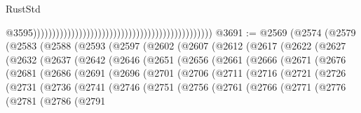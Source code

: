 \begin{lexlean}{RustStd}
\begin{coremodule}
                                                                                                  @3595)))))))))))))))))))))))))))))))))))))))))))))))
@3691 := @2569
    (@2574
      (@2579
        (@2583
          (@2588
            (@2593
              (@2597
                (@2602
                  (@2607
                    (@2612
                      (@2617
                        (@2622
                          (@2627
                            (@2632
                              (@2637
                                (@2642
                                  (@2646
                                    (@2651
                                      (@2656
                                        (@2661
                                          (@2666
                                            (@2671
                                              (@2676
                                                (@2681
                                                  (@2686
                                                    (@2691
                                                      (@2696
                                                        (@2701
                                                          (@2706
                                                            (@2711
                                                              (@2716
                                                                (@2721
                                                                  (@2726
                                                                    (@2731
                                                                      (@2736
                                                                        (@2741
                                                                          (@2746
                                                                            (@2751
                                                                              (@2756
                                                                                (@2761
                                                                                  (@2766
                                                                                    (@2771
                                                                                      (@2776
                                                                                        (@2781
                                                                                          (@2786
                                                                                            (@2791

\end{coremodule}
\end{lexlean}
